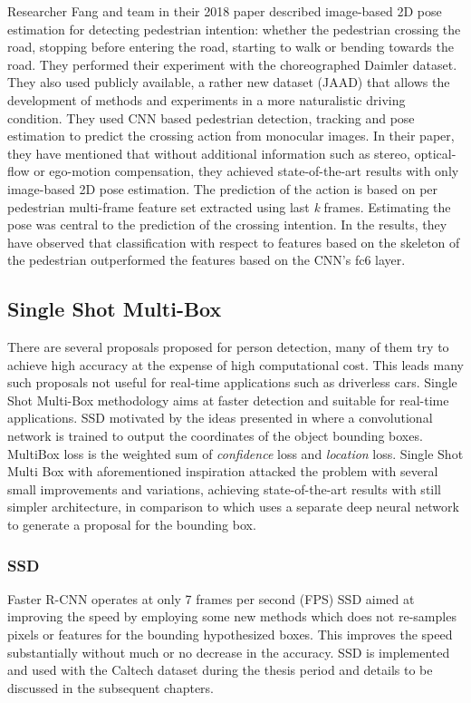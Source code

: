 \newpara
Researcher Fang and team in their 2018 paper \cite{fang2018pedestrian} described image-based 2D pose estimation for detecting pedestrian intention: whether the pedestrian crossing the road, stopping before entering the road, starting to walk or bending towards the road. They performed their experiment with the choreographed Daimler dataset. They also used publicly available, a rather new dataset (JAAD) \cite{kotseruba2016joint} that allows the development of methods and experiments in a more naturalistic driving condition. They used CNN based pedestrian detection, tracking and pose estimation to predict the crossing action from monocular images. In their paper, they have mentioned that without additional information such as stereo, optical-flow or ego-motion compensation, they achieved state-of-the-art results with only image-based 2D pose estimation. The prediction of the action is based on per pedestrian multi-frame feature set extracted using last \textit{k} frames. Estimating the pose was central to the prediction of the crossing intention. In the results, they have observed that classification with respect to features based on the skeleton of the pedestrian outperformed the features based on the CNN's fc6 layer.

\subsection{Single Shot Multi-Box}
There are several proposals proposed for person detection, many of them try to achieve high accuracy at the expense of high computational cost. This leads many such proposals not useful for real-time applications such as driverless cars. Single Shot Multi-Box methodology aims at faster detection and suitable for real-time applications.  
SSD motivated by the ideas presented in \cite{szegedy2014scalable} where a convolutional network is trained to output the coordinates of the object bounding boxes. MultiBox loss is the weighted sum of \textit{confidence} loss and \textit{location} loss. Single Shot Multi Box with aforementioned inspiration attacked the problem with several small improvements and variations, achieving state-of-the-art results with still simpler architecture, in comparison to \cite{szegedy2014scalable} which uses a separate deep neural network to generate a proposal for the bounding box.

\subsubsection{SSD}
Faster R-CNN operates at only 7 frames per second (FPS) SSD aimed at improving the speed by employing some new methods which does not re-samples pixels or features for the bounding hypothesized boxes. This improves the speed substantially without much or no decrease in the accuracy. SSD is implemented and used with the Caltech dataset \cite{dollar2009pedestrian} during the thesis period and details to be discussed in the subsequent chapters.

